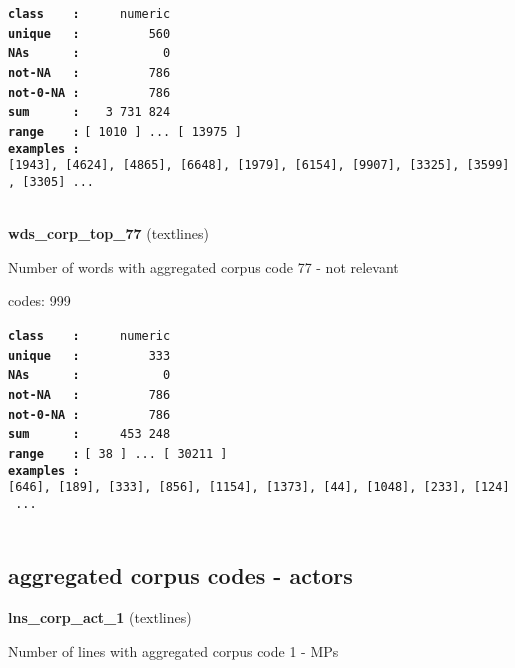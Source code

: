 \documentclass[]{article}
\begin{document}
\textbf{\texttt{class\ \ \ \ :}} \texttt{~~~~~numeric}\\
\textbf{\texttt{unique\ \ \ :}} \texttt{~~~~~~~~~560}\\
\textbf{\texttt{NAs\ \ \ \ \ \ :}} \texttt{~~~~~~~~~~~0}\\
\textbf{\texttt{not-NA\ \ \ :}} \texttt{~~~~~~~~~786}\\
\textbf{\texttt{not-0-NA\ :}} \texttt{~~~~~~~~~786}\\
\textbf{\texttt{sum\ \ \ \ \ \ :}} \texttt{~~~3~731~824}\\
\textbf{\texttt{range\ \ \ \ :}}
\texttt{{[}\ 1010\ {]}\ ...\ {[}\ 13975\ {]}}\\
\textbf{\texttt{examples\ :}}
\texttt{{[}1943{]},\ {[}4624{]},\ {[}4865{]},\ {[}6648{]},\ {[}1979{]},\ {[}6154{]},\ {[}9907{]},\ {[}3325{]},\ {[}3599{]},\ {[}3305{]}\ ...}\\

~

\textbf{wds\_corp\_top\_77} (textlines)

Number of words with aggregated corpus code 77 - not relevant

codes: 999

\textbf{\texttt{class\ \ \ \ :}} \texttt{~~~~~numeric}\\
\textbf{\texttt{unique\ \ \ :}} \texttt{~~~~~~~~~333}\\
\textbf{\texttt{NAs\ \ \ \ \ \ :}} \texttt{~~~~~~~~~~~0}\\
\textbf{\texttt{not-NA\ \ \ :}} \texttt{~~~~~~~~~786}\\
\textbf{\texttt{not-0-NA\ :}} \texttt{~~~~~~~~~786}\\
\textbf{\texttt{sum\ \ \ \ \ \ :}} \texttt{~~~~~453~248}\\
\textbf{\texttt{range\ \ \ \ :}}
\texttt{{[}\ 38\ {]}\ ...\ {[}\ 30211\ {]}}\\
\textbf{\texttt{examples\ :}}
\texttt{{[}646{]},\ {[}189{]},\ {[}333{]},\ {[}856{]},\ {[}1154{]},\ {[}1373{]},\ {[}44{]},\ {[}1048{]},\ {[}233{]},\ {[}124{]}\ ...}\\

~

\subsection{aggregated corpus codes -
actors}\label{aggregated-corpus-codes---actors}

\textbf{lns\_corp\_act\_1} (textlines)

Number of lines with aggregated corpus code 1 - MPs
\end{document}
